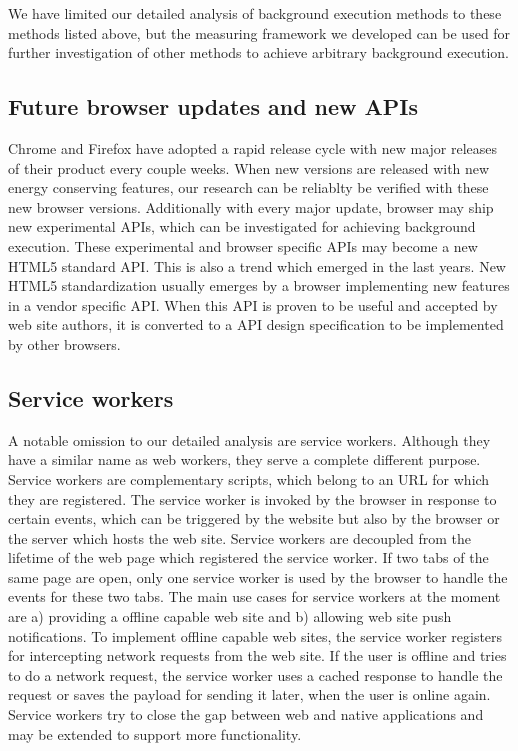 \documentclass[
	ruledheaders=section,%
	class=report,%
	thesis={type=bachelor},%
	accentcolor=9c,%
	custommargins=true,%
	marginpar=false,%
	parskip=half-,%
	fontsize=11pt,%
]{tudapub}
\begin{document}
  We have limited our detailed analysis of background execution methods to these methods listed above, but the measuring framework we developed can be used for further investigation of other methods to achieve arbitrary background execution.

  \subsection{Future browser updates and new APIs}

  Chrome and Firefox have adopted a rapid release cycle with new major releases of their product every couple weeks. When new versions are released with new energy conserving features, our research can be reliablty be verified with these new browser versions. Additionally with every major update, browser may ship new experimental APIs, which can be investigated for achieving background execution. These experimental and browser specific APIs may become a new HTML5 standard API. This is also a trend which emerged in the last years. New HTML5 standardization usually emerges by a browser implementing new features in a vendor specific API. When this API is proven to be useful and accepted by web site authors, it is converted to a API design specification to be implemented by other browsers.
  
  \subsection{Service workers}

  A notable omission to our detailed analysis are service workers. Although they have a similar name as web workers, they serve a complete different purpose. Service workers are complementary scripts, which belong to an URL for which they are registered. The service worker is invoked by the browser in response to certain events, which can be triggered by the website but also by the browser or the server which hosts the web site. Service workers are decoupled from the lifetime of the web page which registered the service worker. If two tabs of the same page are open, only one service worker is used by the browser to handle the events for these two tabs. The main use cases for service workers at the moment are a) providing a offline capable web site and b) allowing web site push notifications. To implement offline capable web sites, the service worker registers for intercepting network requests from the web site. If the user is offline and tries to do a network request, the service worker uses a cached response to handle the request or saves the payload for sending it later, when the user is online again. Service workers try to close the gap between web and native applications and may be extended to support more functionality.
\end{document}
